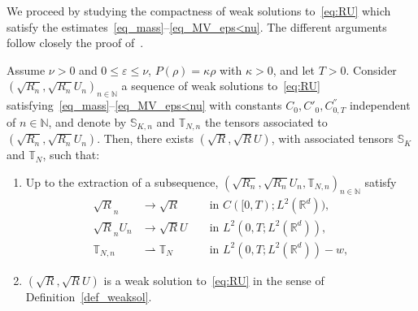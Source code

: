 We proceed by studying the compactness of weak solutions to~\eqref{eq:RU} which satisfy the estimates~\eqref{eq_mass}--\eqref{eq_MV_eps<nu}. The different arguments follow closely the proof of~\cite[Theorem~2.1]{MelletVasseur}.

\begin{theo}\label{theo:compacite}
Assume $\nu >0$ and $0 \le \varepsilon \le \nu$, $P(\rho)=\kappa \rho$ with $\kappa >0$, and let $T>0$. Consider $(\sqrt{R_n}, \sqrt{R_n} U_n)_{n\in \mathbb N}$ a sequence of weak solutions to~\eqref{eq:RU} satisfying~\eqref{eq_mass}--\eqref{eq_MV_eps<nu} with constants $C_0,C'_0,C^{''}_{0,T}$ independent of $n \in \mathbb N$, and denote by $\mathbb S_{K,n}$ and $\mathbb T_{N,n}$ the tensors associated to $(\sqrt{R_n}, \sqrt{R_n} U_n)$. Then, there exists $(\sqrt{R},\sqrt{R}U)$, with associated tensors $\mathbb S_K$ and $\mathbb T_N$, such that:
\begin{enumerate}
\item \label{4.10.1} Up to the extraction of a subsequence, $(\sqrt{R_n},\sqrt{R_n} U_n,\mathbb T_{N,n})_{n\in \mathbb N}$ satisfy
\[
\begin{aligned}
\sqrt{R}_n &\to \sqrt{R} && \text{ in } C([0,T) ; L^2(\mathbb R^d)), \\
\sqrt{R}_n U_n &\to \sqrt{R}U &&\text{ in $L^2(0,T;L^2(\mathbb R^d)),$} \\
\mathbb T_{N,n} &\rightharpoonup \mathbb T_N && \text{ in $L^2(0,T;L^2(\mathbb R^d))-w$},
\end{aligned}
\]
\item \label{4.10.2} $(\sqrt{R},\sqrt{R} U)$ is a weak solution to~\eqref{eq:RU} in the sense of Definition~\ref{def_weaksol}.
\end{enumerate}
\end{theo}

